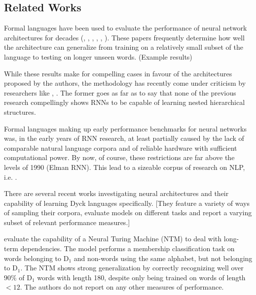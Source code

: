 
\subsection{Related Works}\label{relatedWorks}

Formal languages have been used to evaluate the performance of neural network architectures for decades (\cite{Cleeremans1989}, \cite{Zeng1994}, \cite{Hochreiter1997}, \cite{Rodriguez1998}, \cite{GersSchmidhuber2001}, \cite{JoulinMikolov2015}). These papers frequently determine how well the architecture can generalize from training on a relatively small subset of the language to testing on longer unseen words. (Example results)


While these results make for compelling cases in favour of the architectures proposed by the authors, the methodology has recently come under criticism by researchers like \cite{Bernardy2018}, \cite{Sennhauser2018}. The former goes as far as to say that none of the previous research compellingly shows RNNs to be capable of learning nested hierarchical structures.


Formal languages making up early performance benchmarks for neural networks was, in the early years of RNN research, at least partially caused by the lack of comparable natural language corpora and of reliable hardware with sufficient computational power. By now, of course, these restrictions are far above the levels of 1990 (Elman RNN). This lead to a sizeable corpus of research on NLP, i.e. \cite{Karpathy2015}.


There are several recent works investigating neural architectures and their capability of learning Dyck languages specifically. [They feature a variety of ways of sampling their corpora, evaluate models on different tasks and report a varying subset of relevant performance measures.]

\cite{Deleu2016} evaluate the capability of a Neural Turing Machine (NTM) to deal with long-term dependencies. The model performs a membership classification task on words belonging to D$_1$ and non-words using the same alphabet, but not belonging to D$_1$. The NTM shows strong generalization by correctly recognizing well over $90 \%$ of D$_1$ words with length 180, despite only being trained on words of length $<12$. The authors do not report on any other measures of performance.

